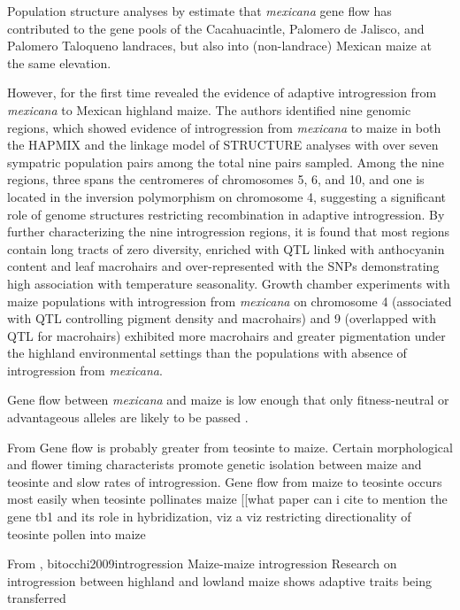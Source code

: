 \documentclass[11pt]{article}
\begin{document}
Population structure analyses by \cite{matsuoka2002single} estimate that \emph{mexicana} gene flow has contributed to the gene pools of the Cacahuacintle, Palomero de Jalisco, and Palomero Taloqueno landraces, but also into (non-landrace) Mexican maize at the same elevation.

However, \cite{hufford2013} for the first time revealed the evidence of adaptive introgression from \emph{mexicana} to Mexican highland maize.
The authors identified nine genomic regions, which showed evidence of introgression from \emph{mexicana} to maize in both the HAPMIX and the linkage model of STRUCTURE analyses with over seven sympatric population pairs among the total nine pairs sampled. 
Among the nine regions, three spans the centromeres of chromosomes 5, 6, and 10, and one is located in the inversion polymorphism on chromosome 4, suggesting a significant role of genome structures restricting recombination in adaptive introgression.
By further characterizing the nine introgression regions, it is found that most regions contain long tracts of zero diversity, enriched with QTL linked with anthocyanin content and leaf macrohairs \cite{lauter2004} and over-represented with the SNPs demonstrating high association with temperature seasonality.
Growth chamber experiments with maize populations with introgression from \emph{mexicana} on chromosome 4 (associated with QTL controlling pigment density and macrohairs) and 9 (overlapped with QTL for macrohairs) exhibited more macrohairs and greater pigmentation under the highland environmental settings than the populations with absence of introgression from \emph{mexicana}.

Gene flow between \emph{mexicana} and maize is low enough that only fitness-neutral or advantageous alleles are likely to be passed \cite{slatkin1987gene}.

From \cite{baltazar2005pollination}
Gene flow is probably greater from teosinte to maize.
Certain morphological and flower timing characterists promote genetic isolation between maize and teosinte and slow rates of introgression.
Gene flow from maize to teosinte occurs most easily when teosinte pollinates maize
[[what paper can i cite to mention the gene tb1 and its role in hybridization, viz a viz restricting directionality of teosinte pollen into maize

From \cite{jiang1999genetic}, {bitocchi2009introgression}
Maize-maize introgression
Research on introgression between highland and lowland maize shows adaptive traits being transferred
\end{document}
